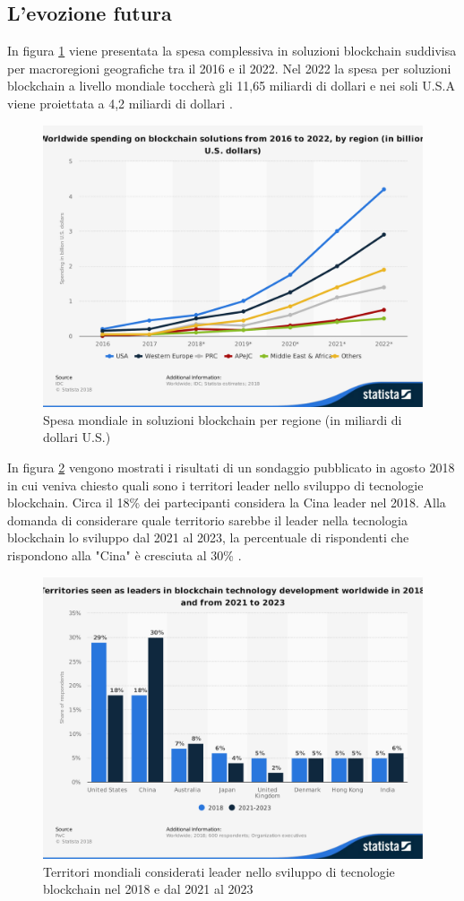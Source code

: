 \subsection{L'evozione futura}
In figura \ref{fig:global-blockchain-solutions-spending} viene presentata la spesa complessiva
in soluzioni blockchain suddivisa per macroregioni geografiche tra il 2016 e il 2022.
Nel 2022 la spesa per soluzioni blockchain a livello mondiale toccherà gli 11,65 miliardi di dollari
e nei soli U.S.A viene proiettata a 4,2 miliardi di dollari \cite{global-blockchain-solutions-spending}.
\begin{figure}[H]
	\centering
	\includegraphics[width=.6\linewidth]{images/chap_intro/global-blockchain-solutions-spending.pdf}
	\caption{Spesa mondiale in soluzioni blockchain per regione (in miliardi di
		dollari U.S.) \cite{global-blockchain-solutions-spending}}
	\label{fig:global-blockchain-solutions-spending}
\end{figure}

In figura \ref{fig:leading-territories-worldwide} vengono mostrati i risultati di un sondaggio
pubblicato in agosto 2018 in cui veniva chiesto
quali sono i territori leader nello sviluppo di tecnologie blockchain.
Circa il 18\% dei partecipanti considera la Cina leader nel 2018.
Alla domanda di considerare quale territorio sarebbe il leader nella tecnologia blockchain
lo sviluppo dal 2021 al 2023, la percentuale di rispondenti che
rispondono alla "Cina" è cresciuta al 30\% \cite{leading-territories-worldwide}.

\begin{figure}[H]
	\centering
	\includegraphics[width=.6\linewidth]{images/chap_intro/leading-territories-worldwide.pdf}
	\caption{Territori mondiali considerati leader nello sviluppo di tecnologie blockchain
		nel 2018 e dal 2021 al 2023
		\cite{leading-territories-worldwide}}
	\label{fig:leading-territories-worldwide}
\end{figure}

